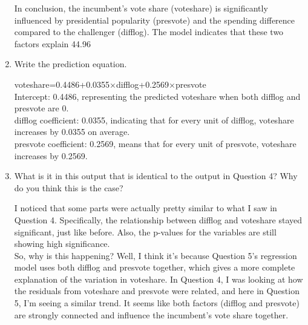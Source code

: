 \documentclass[12pt,letterpaper]{article}
\begin{document}
\begin{enumerate}
		In conclusion, the incumbent’s vote share (voteshare) is significantly influenced by presidential popularity (presvote) and the spending difference compared to the challenger (difflog). The model indicates that these two factors explain 44.96%
		
		
		\item Write the prediction equation.	
	
			voteshare=0.4486+0.0355×difflog+0.2569×presvote\\
			
			Intercept: 0.4486, representing the predicted voteshare when both difflog and presvote are 0.\\
			difflog coefficient: 0.0355, indicating that for every unit of difflog, voteshare increases by 0.0355 on average.\\
			presvote coefficient: 0.2569, means that for every unit of presvote, voteshare increases by 0.2569.\\

		
		\item What is it in this output that is identical to the output in Question 4? Why do you think this is the case?
		
			I noticed that some parts were actually pretty similar to what I saw in Question 4. Specifically, the relationship between difflog and voteshare stayed significant, just like before. Also, the p-values for the variables are still showing high significance.\\
			
			So, why is this happening? Well, I think it’s because Question 5’s regression model uses both difflog and presvote together, which gives a more complete explanation of the variation in voteshare. In Question 4, I was looking at how the residuals from voteshare and presvote were related, and here in Question 5, I’m seeing a similar trend. It seems like both factors (difflog and presvote) are strongly connected and influence the incumbent’s vote share together.\\
	
		
	\end{enumerate}
\end{document}

